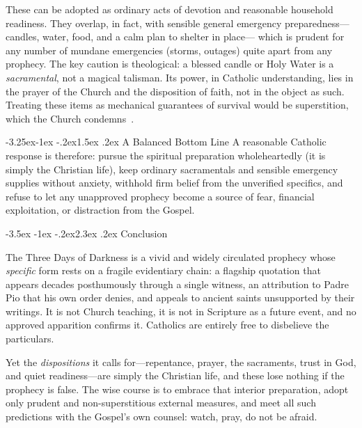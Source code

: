 \documentclass[11pt]{article}
\makeatletter
\renewcommand\section{\@startsection{section}{1}{\z@}%
  {-3.5ex \@plus -1ex \@minus -.2ex}{2.3ex \@plus.2ex}%
  {\normalfont\Large\bfseries\color{accent}}}
\renewcommand\subsection{\@startsection{subsection}{2}{\z@}%
  {-3.25ex\@plus -1ex \@minus -.2ex}{1.5ex \@plus .2ex}%
  {\normalfont\large\bfseries\color{accent}}}
\makeatother
\begin{document}
These can be adopted as ordinary acts of devotion and reasonable household
readiness. They overlap, in fact, with sensible general emergency
preparedness---candles, water, food, and a calm plan to shelter in place---
which is prudent for any number of mundane emergencies (storms, outages)
quite apart from any prophecy. The key caution is theological: a blessed
candle or Holy Water is a \emph{sacramental}, not a magical talisman. Its
power, in Catholic understanding, lies in the prayer of the Church and the
disposition of faith, not in the object as such. Treating these items as
mechanical guarantees of survival would be superstition, which the Church
condemns~\cite{ccc}.

\subsection{A Balanced Bottom Line}
A reasonable Catholic response is therefore: pursue the spiritual preparation
wholeheartedly (it is simply the Christian life), keep ordinary sacramentals
and sensible emergency supplies without anxiety, withhold firm belief from the
unverified specifics, and refuse to let any unapproved prophecy become a
source of fear, financial exploitation, or distraction from the Gospel.

\section{Conclusion}

The Three Days of Darkness is a vivid and widely circulated prophecy whose
\emph{specific} form rests on a fragile evidentiary chain: a flagship
quotation that appears decades posthumously through a single witness, an
attribution to Padre Pio that his own order denies, and appeals to ancient
saints unsupported by their writings. It is not Church teaching, it is not in
Scripture as a future event, and no approved apparition confirms it. Catholics
are entirely free to disbelieve the particulars.

Yet the \emph{dispositions} it calls for---repentance, prayer, the
sacraments, trust in God, and quiet readiness---are simply the Christian life,
and these lose nothing if the prophecy is false. The wise course is to embrace
that interior preparation, adopt only prudent and non-superstitious external
measures, and meet all such predictions with the Gospel's own counsel: watch,
pray, do not be afraid.
\end{document}

